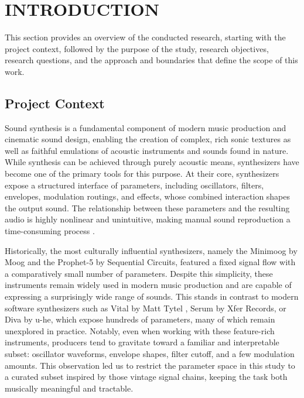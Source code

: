 
\section{INTRODUCTION}
\label{sec:introduction}

This section provides an overview of the conducted research, starting with the project context, followed by the purpose of the study, research objectives, research questions, and the approach and boundaries that define the scope of this work.

\subsection{Project Context}

Sound synthesis is a fundamental component of modern music production and cinematic sound design, enabling the creation of complex, rich sonic textures as well as faithful emulations of acoustic instruments and sounds found in nature. While synthesis can be achieved through purely acoustic means, synthesizers have become one of the primary tools for this purpose. At their core, synthesizers expose a structured interface of parameters, including oscillators, filters, envelopes, modulation routings, and effects, whose combined interaction shapes the output sound. The relationship between these parameters and the resulting audio is highly nonlinear and unintuitive, making manual sound reproduction a time-consuming process \cite{roads1996computer, cook2002realsound}.

\par \vspace{0.5cm}

\noindent Historically, the most culturally influential synthesizers, namely the Minimoog by Moog and the Prophet-5 by Sequential Circuits, featured a fixed signal flow with a comparatively small number of parameters. Despite this simplicity, these instruments remain widely used in modern music production and are capable of expressing a surprisingly wide range of sounds. This stands in contrast to modern software synthesizers such as Vital by Matt Tytel \cite{tytel2020vital}, Serum by Xfer Records, or Diva by u-he, which expose hundreds of parameters, many of which remain unexplored in practice. Notably, even when working with these feature-rich instruments, producers tend to gravitate toward a familiar and interpretable subset: oscillator waveforms, envelope shapes, filter cutoff, and a few modulation amounts. This observation led us to restrict the parameter space in this study to a curated subset inspired by those vintage signal chains, keeping the task both musically meaningful and tractable.

